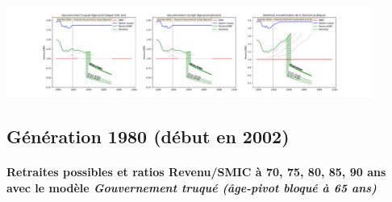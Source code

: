  \begin{center}\includegraphics[width=0.9\textwidth]{fig/AdjTech_1975_22_dest_retraite.pdf}\end{center} \label{fig/AdjTech_1975_22_dest_retraite.pdf} 

\newpage 
 
\subsection{Génération 1980 (début en 2002)} 

\paragraph{Retraites possibles et ratios Revenu/SMIC à 70, 75, 80, 85, 90 ans avec le modèle \emph{Gouvernement truqué (âge-pivot bloqué à 65 ans)}}  
 
